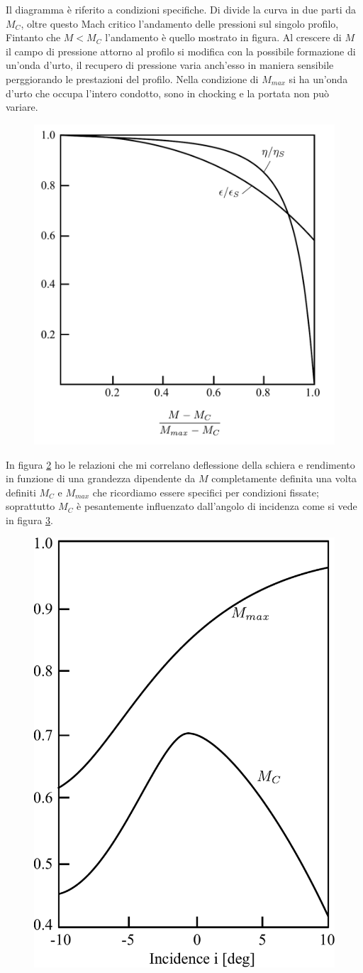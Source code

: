 \begin{figure}
\begin{minipage}{.4\textwidth}
  \label{fig:FuoriProgMach}
\end{minipage}
\end{figure}
Il diagramma è riferito a condizioni specifiche. Di divide la curva in due parti da $M_C$, oltre questo Mach critico l'andamento delle pressioni sul singolo profilo, Fintanto che $ M < M_C$ l'andamento è quello mostrato in figura. Al crescere di $M$ il campo di pressione attorno al profilo si modifica con la possibile formazione di un'onda d'urto, il recupero di pressione varia anch'esso in maniera sensibile perggiorando le prestazioni del profilo. Nella condizione di $ M_{max} $ si ha un'onda d'urto che occupa l'intero condotto, sono in chocking e la portata non può variare.
\begin{figure}
\centering
  \includegraphics[width=.4\textwidth]{fig/FuoriProg3.pdf}
\caption{}
\label{fig:FuoriProg3}
\end{figure}
In figura \ref{fig:FuoriProg3} ho le relazioni che mi correlano deflessione della schiera e rendimento in funzione di una grandezza dipendente da $M$ completamente definita una volta definiti $M_C$ e $M_{max}$ che ricordiamo essere specifici per condizioni fissate; soprattutto $M_C$ è pesantemente influenzato dall'angolo di incidenza come si vede in figura \ref{fig:FuoriProg4}.
\begin{figure}
\centering
  \includegraphics[width=.4\textwidth]{fig/FuoriProg4.pdf}
\caption{}
\label{fig:FuoriProg4}
\end{figure}

